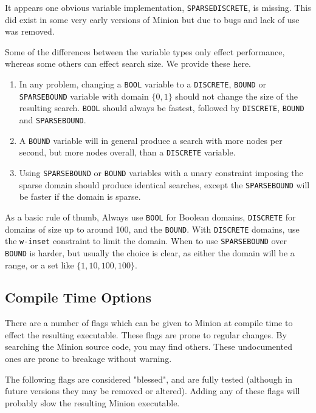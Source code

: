 \documentclass{article}
\newcommand{\BOOL}{\texttt{BOOL}\xspace}
\newcommand{\DISCRETE}{\texttt{DISCRETE}\xspace}
\newcommand{\BOUND}{\texttt{BOUND}\xspace}
\newcommand{\SPARSEBOUND}{\texttt{SPARSEBOUND}\xspace}
\begin{document}
It appears one obvious variable implementation, \texttt{SPARSEDISCRETE}, is missing. This did exist in some very early versions of Minion but due to bugs and lack of use was removed. 

Some of the differences between the variable types only effect performance, whereas some others can effect search size. We provide these here.

\begin{enumerate}
\item In any problem, changing a \BOOL variable to a \DISCRETE, \BOUND or \SPARSEBOUND variable with domain \(\{0,1\}\) should not change the size of the resulting search. \BOOL should always be fastest, followed by \DISCRETE, \BOUND and \SPARSEBOUND.

\item A \BOUND variable will in general produce a search with more nodes per second, but more nodes overall, than a \DISCRETE variable.

\item Using \SPARSEBOUND or \BOUND variables with a unary constraint imposing the sparse domain should produce identical searches, except the \SPARSEBOUND will be faster if the domain is sparse. 
\end{enumerate}

As a basic rule of thumb, Always use \BOOL for Boolean domains, \DISCRETE for domains of size up to around 100, and the \BOUND. With \DISCRETE domains, use the \texttt{w-inset} constraint to limit the domain. When to use \SPARSEBOUND over \BOUND is harder, but usually the choice is clear, as either the domain will be a range, or a set like \(\{1,10,100,100\}\).

\subsection{Compile Time Options}

There are a number of flags which can be given to Minion at compile time to effect the resulting executable. These flags are prone to regular changes. By searching the Minion source code, you may find others. These undocumented ones are prone to breakage without warning.

The following flags are considered "blessed", and are fully tested (although in future versions they may be removed or altered). Adding any of these flags will probably slow the resulting Minion executable.
\end{document}
